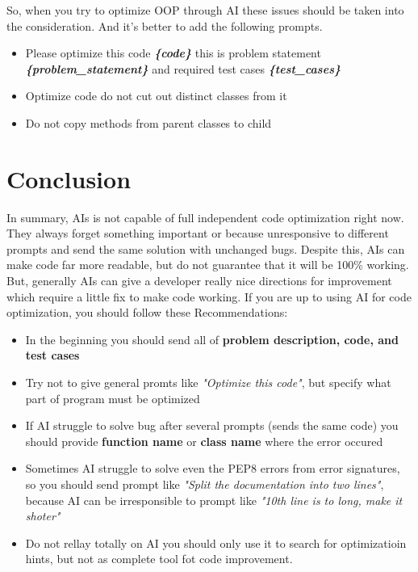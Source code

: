 \documentclass[12pt]{report}
\begin{document}
			So, when you try to optimize OOP through AI these issues should be taken
			into the consideration. And it’s better to add the following prompts.
			
			\begin{itemize}
				\item Please optimize this code \textbf{\textit{\{code\}}} this is problem statement
				\textbf{\textit{\{problem\_statement\}}} and required test cases \textbf{\textit{\{test\_cases\}}}
				\item Optimize code do not cut out distinct classes from it
				\item Do not copy methods from parent classes to child
	\end{itemize}
	
	\section{Conclusion}
		In summary, AIs is not capable of full independent code optimization right
		now. They always forget something important or because unresponsive to
		different prompts and send the same solution with unchanged bugs. Despite
		this, AIs can make code far more readable, but do not guarantee that it
		will be 100\% working. But, generally AIs can give a developer really nice
		directions for improvement which require a little fix to make code working.
		If you are up to using AI for code optimization, you should follow these
		Recommendations:
		

		\begin{itemize}
			\item In the beginning you should send all of \textbf{problem description, code, and test cases}
			\item Try not to give general promts like \textit{"Optimize this code"}, but specify what part of program 
			must be optimized
			\item If AI struggle to solve bug after several prompts (sends the same code) you should provide \textbf{function name} or \textbf{class name} where the error occured
			\item Sometimes AI struggle to solve even the PEP8 errors from error signatures, so you should send prompt like \textit{"Split the documentation into two lines"}, because AI can be irresponsible to prompt like \textit{"10th line is to long, make it shoter"}
			\item Do not rellay totally on AI you should only use it to search for optimizatioin hints, but not as complete tool fot code improvement.
		\end{itemize}
	
	
\end{document}
